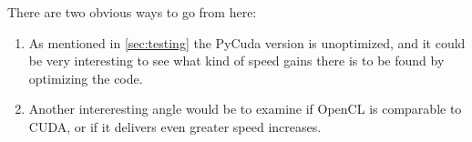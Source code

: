 There are two obvious ways to go from here:

\begin{enumerate}
\item As mentioned in \autoref{sec:testing} the PyCuda version is unoptimized, and it could be very interesting to see what kind of speed gains there is to be found by optimizing the code.
\item Another intereresting angle would be to examine if OpenCL is comparable to CUDA, or if it delivers even greater speed increases.
\end{enumerate}

\newpage


\newpage





